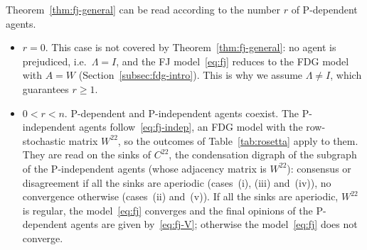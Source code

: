 Theorem~\ref{thm:fj-general} can be read according to the number $r$ of P-dependent
agents.
\begin{itemize}
  \item $r = 0$. This case is not covered by Theorem~\ref{thm:fj-general}: no agent is
        prejudiced, i.e.\ $\Lambda = I$, and the FJ model~\eqref{eq:fj} reduces to the
        FDG model with $A = W$ (Section~\ref{subsec:fdg-intro}). This is why we assume
        $\Lambda \neq I$, which guarantees $r \geq 1$.
  \item $0 < r < n$. P-dependent and P-independent agents coexist. The P-independent
        agents follow~\eqref{eq:fj-indep}, an FDG model with the row-stochastic matrix
        $W^{22}$, so the outcomes of Table~\ref{tab:rosetta} apply to them. They are read
        on the sinks of $C^{22}$, the condensation digraph of the subgraph of the
        P-independent agents (whose adjacency matrix is $W^{22}$): consensus or
        disagreement if all the sinks are aperiodic (cases~(i), (iii) and~(iv)), no
        convergence otherwise (cases~(ii) and~(v)). If all the sinks are aperiodic,
        $W^{22}$ is regular, the model~\eqref{eq:fj} converges and the final opinions of
        the P-dependent agents are given by~\eqref{eq:fj-V}; otherwise the
        model~\eqref{eq:fj} does not converge.

\end{itemize}
